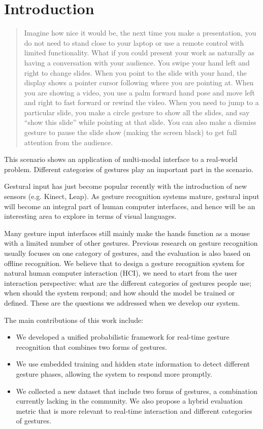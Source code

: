 \documentclass[conference]{IEEEtran}
\begin{document}
\section{Introduction}
\begin{quotation}
Imagine how nice it would be, the next time you make a presentation, you do
not need to stand close to your laptop or use a remote control with limited
functionality. What if you could present your work as naturally as having a
conversation with your audience. You swipe your hand left and right to change slides. When you point to the slide
with your hand, the display shows a pointer cursor following where you are
pointing at. When you are showing a video,
you use a palm forward hand pose and move left and right to fast forward or
rewind the video. 
When you need to jump to a particular slide, you make a circle
gesture to show all the slides, and say ``show this
slide'' while pointing at that slide. You can also make a dismiss gesture to
pause the slide show (making the screen black) to 
get full attention from the audience.
\end{quotation}

This scenario shows an application of multi-modal interface to a
real-world problem. Different categories of gestures play an important part in
the scenario. 

Gestural input has just become popular recently with the introduction
of new sensors (e.g. Kinect, Leap). As gesture recognition systems mature,
gestural input will become an integral part of human computer interfaces, and
hence will be an interesting area to explore in terms of visual languages.

Many gesture input interfaces still mainly make the hands function as a
mouse with a limited number of other gestures. 
Previous research on gesture
recognition usually focuses on one category of gestures, and the evaluation is
also based on offline recognition.
 We believe that to design a gesture
recognition system for natural human computer interaction (HCI), we need to
start from the user interaction perspective:
what are the different categories of gestures people use;
when should the system respond; and how should the model be trained or defined.
These are the questions we addressed when we develop our system.

The main contributions of this work include:
\begin{itemize}
  \item We developed a unified probabilistic framework for real-time gesture
  recognition that combines two forms of gestures.
  \item We use embedded training and hidden state information to detect
  different gesture phases, allowing the system to respond more promptly.
  \item We collected a new dataset that include two forms of gestures, a
  combination currently lacking in the community. We also propose a hybrid
  evaluation metric that is more relevant to real-time interaction and different
  categories of gestures.
\end{itemize}
\end{document}
